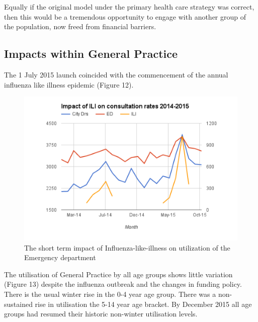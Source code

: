 \documentclass[11pt,a4paper]{article}
\begin{document}
Equally if the original model under the primary health care strategy was correct, then this would be a tremendous opportunity to engage with another group of the population, now freed from financial barriers.\\ 


\subsection{Impacts within General Practice}
The 1 July 2015 launch coincided with the commencement of the annual influenza like illness epidemic (Figure 12). \\


\begin{figure}[htp]
\centering
\includegraphics[scale=0.50]{ILI.png}
\caption{The short term impact of Influenza-like-illness on utilization of the Emergency department}
\label{Impact of Influenza-like-illness}
\end{figure}


The utilisation of General Practice by all age groups shows little variation (Figure 13) despite the influenza outbreak and the changes in funding policy. There is the usual winter rise in the 0-4 year age group. There was a non-sustained rise in utilisation the 5-14 year age bracket. By December 2015 all age groups had resumed their historic non-winter utilisation levels. \\
\end{document}
